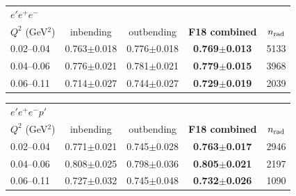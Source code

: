 \begin{tabular}{lcccr}\toprule
\multicolumn{5}{l}{$e'e^+e^-$}\\
$Q^2$ (GeV$^2$) & inbending & outbending & \textbf{F18 combined} & $n_{\rm rad}$ \\\midrule
0.02--0.04 & 0.763$\pm$0.018 & 0.776$\pm$0.018 & \textbf{0.769$\pm$0.013} & 5133 \\
0.04--0.06 & 0.776$\pm$0.021 & 0.781$\pm$0.021 & \textbf{0.779$\pm$0.015} & 3968 \\
0.06--0.11 & 0.714$\pm$0.027 & 0.744$\pm$0.027 & \textbf{0.729$\pm$0.019} & 2039 \\
\bottomrule\end{tabular}

\medskip

\begin{tabular}{lcccr}\toprule
\multicolumn{5}{l}{$e'e^+e^-p'$}\\
$Q^2$ (GeV$^2$) & inbending & outbending & \textbf{F18 combined} & $n_{\rm rad}$ \\\midrule
0.02--0.04 & 0.771$\pm$0.021 & 0.745$\pm$0.028 & \textbf{0.763$\pm$0.017} & 2946 \\
0.04--0.06 & 0.808$\pm$0.025 & 0.798$\pm$0.036 & \textbf{0.805$\pm$0.021} & 2197 \\
0.06--0.11 & 0.727$\pm$0.032 & 0.745$\pm$0.048 & \textbf{0.732$\pm$0.026} & 1090 \\
\bottomrule\end{tabular}

\medskip

